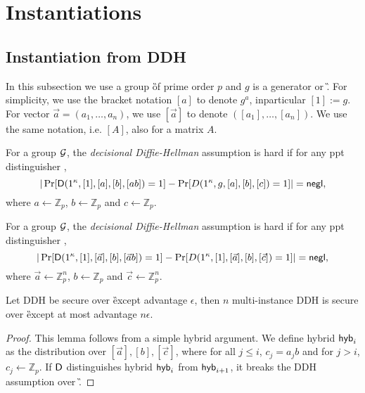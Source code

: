 \section{Instantiations}
\newcommand{\Z}{\ensuremath{\mathbb Z}\xspace}

\subsection{Instantiation from DDH}

In this subsection we use a group \G of prime order $p$ and $g$ is a generator or \G. For simplicity, we use the bracket notation $[a]$ to denote $g^a$, inparticular $[1]:=g$. For vector $\vec{a}=(a_1,\ldots,a_n)$, we use $[\vec{a}]$ to denote $([a_1],\ldots,[a_n])$. We use the same notation, i.e. $[A]$, also for a matrix $A$.

\begin{definition}
For a group $\mathcal{G}$, the \emph{decisional Diffie-Hellman} assumption is hard if for any ppt distinguisher \D,
$$
|\Pr[\mathsf D(1^\kappa,[1],[a],[b],[ab])=1]-\Pr[D(1^\kappa,g,[a],[b],[c])=1]|=\mathsf{negl},
$$
where $a\leftarrow\Z_p$, $b\leftarrow\Z_p$ and $c\leftarrow\Z_p$.
\end{definition}

\begin{definition}
For a group $\mathcal{G}$, the \emph{decisional Diffie-Hellman} assumption is hard if for any ppt distinguisher \D,
$$
|\Pr[\mathsf D(1^\kappa,[1],[\vec{a}],[b],[\vec{a}b])=1]-\Pr[D(1^\kappa,[1],[\vec{a}],[b],[\vec{c}])=1]|=\mathsf{negl},
$$
where $\vec{a}\leftarrow\Z_p^n$, $b\leftarrow\Z_p$ and $\vec{c}\leftarrow\Z_p^n$.
\end{definition}

\begin{lemma}
Let DDH be secure over \G except advantage $\epsilon$, then $n$ multi-instance DDH is secure over \G except at most advantage $n\epsilon$.
\end{lemma}

\begin{proof}
This lemma follows from a simple hybrid argument. We define hybrid $\mathsf{hyb}_i$ as the distribution over $[\vec{a}],[b],[\vec{c}]$, where for all $j\leq i$, $c_j=a_jb$ and for $j>i$, $c_j\leftarrow\Z_p$. If $\mathsf D$ distinguishes hybrid $\mathsf{hyb}_i$ from $\mathsf{hyb}_{i+1}$, it breaks the DDH assumption over \G.
\end{proof}


